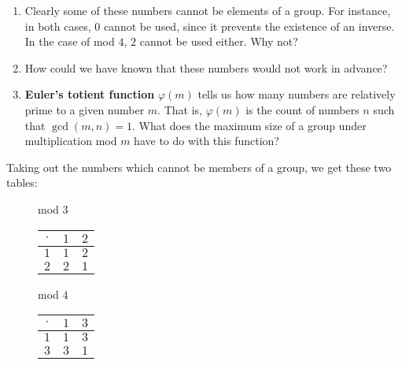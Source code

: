 \documentclass[../gatm.tex]{subfiles}
\begin{document}
\begin{enumerate}
\item Clearly some of these numbers cannot be elements of a group. For instance, in both cases, $0$ cannot be used, since it prevents the existence of an inverse. In the case of mod $4$, $2$ cannot be used either. Why not?
\item How could we have known that these numbers would not work in advance?
\item \textbf{Euler's totient function} $\varphi(m)$ tells us how many numbers are relatively prime to a given number $m$. That is, $\varphi(m)$ is the count of numbers $n$ such that $\gcd(m,n)=1$. What does the maximum size of a group under multiplication mod $m$ have to do with this function?
\setcounter{problem_i}{\value{enumi}}
\end{enumerate}

\noindent Taking out the numbers which cannot be members of a group, we get these two tables:

\begin{figure}[h]
	\begin{center}
		\begin{minipage}[t]{0.45\textwidth}
			\centering
			mod $3$ \\
			\vspace*{0.5\baselineskip}
			\begin{tabular}{c|cc}
				\hline
				$\cdot$ & $1$ & $2$ \\ \hline
				\rowcolor{light-gray}
				$1$ & $1$ & $2$ \\
				$2$ & $2$ & $1$ \\ \hline
			\end{tabular}
			\vspace*{0.5\baselineskip}
		\end{minipage}
		\hfill
		\begin{minipage}[t]{0.45\textwidth}
			\centering
			mod $4$ \\
			\vspace*{0.5\baselineskip}
			\begin{tabular}{c|cc}
				\hline
				$\cdot$ & $1$ & $3$ \\ \hline
				\rowcolor{light-gray}
				$1$ & $1$ & $3$ \\
				$3$ & $3$ & $1$ \\ \hline
			\end{tabular}
			\vspace*{0.5\baselineskip}
		\end{minipage}
	\end{center}
	\vspace*{-2\baselineskip}
\end{figure}
\end{document}
